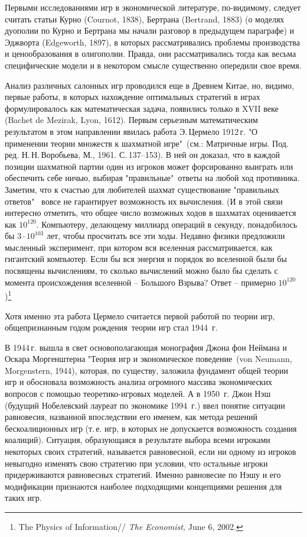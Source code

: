 Первыми исследованиями игр в экономической литературе, по-видимому,
следует считать статьи Курно (Cournot, 1838), Бертрана (Bertrand,
1883) (о моделях дуополии по Курно и Бертрана мы начали разговор в
предыдущем параграфе) и Эджворта (Edgeworth, 1897), в которых
рассматривались проблемы производства и ценообразования в
олигополии. Правда, они рассматривались тогда как весьма
специфические модели и в некотором смысле существенно опередили свое
время.

Анализ различных салонных игр проводился еще в Древнем Китае, но,
видимо, первые работы, в которых нахождение оптимальных стратегий в
играх формулировалось как математическая задача, появились только в
XVII веке (Bachet de Mezirak, Lyon, 1612). Первым серьезным
математическим результатом в этом направлении явилась работа
Э.\,Цермело 1912\,г.  "О применении теории множеств к шахматной
игре"\, (см.: Матричные игры. Под. ред. Н.\,Н.\,Воробьева, М., 1961.
С.\,137--153). В ней он доказал, что в каждой позиции шахматной
партии один из игроков может форсированно выиграть или обеспечить
себе ничью, выбирая "правильные"\, ответы на любой ход противника.
Заметим, что  к счастью для любителей шахмат существование
"правильных ответов" \, вовсе не гарантирует возможность их
вычисления. (И в этой связи интересно отметить, что общее число
возможных ходов в шахматах оценивается как $10^{120}$. Компьютеру,
делающему миллиард операций в секунду, понадобилось бы $3\cdot10^{103}$
лет, чтобы просчитать все эти ходы. Недавно физики предложили
мысленный эксперимент, при котором вся вселенная рассматривается,
как гигантский компьютер. Если бы вся энергия и порядок во вселенной
были бы посвящены вычислениям, то сколько вычислений можно было бы
сделать с момента происхождения вселенной -- Большого Взрыва?
Ответ -- примерно $10^{120}$)\footnote{The Physics of Information//
\emph{The Economist, } June 6, 2002.}

Хотя именно эта работа Цермело считается первой работой по теории игр,
общепризнанным годом рождения\, теории игр стал 1944~г.

В 1944\,г. вышла в свет основополагающая монография Джона фон
Неймана и Оскара Моргенштерна "Теория игр и экономическое
поведение\, (von Neumann, Morgenstern, 1944), которая, по существу,
заложила фундамент общей теории игр и обосновала возможность анализа
огромного массива экономических вопросов с помощью теоретико-игровых
моделей.  А в 1950~г. Джон Нэш (будущий Нобелевский лауреат по
экономике 1994~г.) ввел понятие ситуации равновесия, названной
впоследствии его именем, как метода решений бескоалиционных игр
(т.\,е. игр, в которых не допускается возможность создания
коалиций).  Ситуация, образующаяся в результате выбора всеми
игроками некоторых своих стратегий, называется равновесной, если ни
одному из игроков невыгодно изменять свою стратегию при условии, что
остальные игроки придерживаются равновесных стратегий. Именно
равновесие по Нэшу и его модификации признаются наиболее подходящими
концепциями решения для таких игр.

